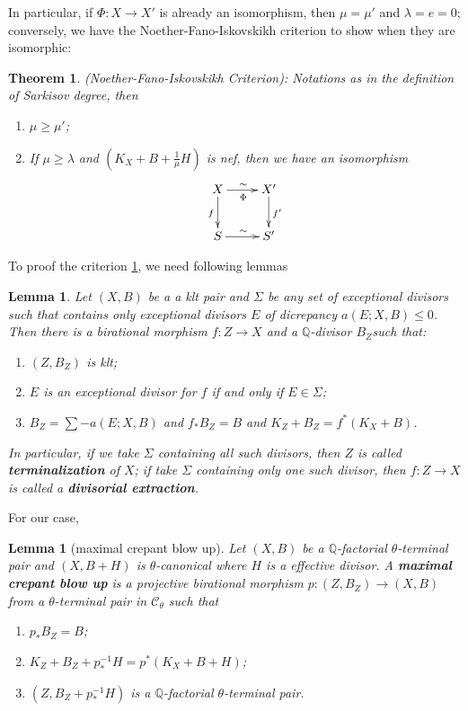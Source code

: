 \documentclass{article}
\newtheorem{lem}[defn]{Lemma}
\newtheorem{thm}[defn]{Theorem}
\begin{document}
In particular, if $\Phi:X\to X'$ is already an isomorphism, then $\mu=\mu'$ and $\lambda=e=0$; conversely, we have the Noether-Fano-Iskovskikh criterion to show when they are isomorphic:
\begin{thm}\label{nfi}
  (Noether-Fano-Iskovskikh Criterion): Notations as in the definition of Sarkisov degree, then 
  \begin{enumerate}
    \item $ \mu\geqslant \mu' $;
    \item If $ \mu \geqslant \lambda $ and $ (K_X+B+\frac{1}{\mu} H) $ is nef, then we have an isomorphism
      \[ \xymatrix{
          X\ar[r]^\sim_\Phi\ar[d]_f&X'\ar[d]^{f'}\\
      S\ar[r]^\sim& S' } \]
  \end{enumerate}
\end{thm}
To proof the criterion \ref{nfi}, we need following lemmas
\begin{lem}\label{extraction}
Let $ (X,B) $ be a a klt pair and $\Sigma$ be any set of exceptional divisors such that  contains only exceptional divisors $ E $ of dicrepancy $ a(E;X,B)\leqslant 0 $. Then there is a birational morphism $ f:Z\to X $ and a $ \mathbb{Q} $-divisor $ B_Z $such that:
  \begin{enumerate}
    \item $ (Z,B_Z) $ is klt;
    \item $ E $ is an exceptional divisor for $ f $ if and only if $ E\in\Sigma $;
    \item $ B_Z=\sum-a(E;X,B) $ and $ f_*B_Z=B $ and $ K_Z+B_Z=f^*(K_X+B) $.
  \end{enumerate} 
  In particular, if we take $ \Sigma $ containing all such divisors, then $ Z $ is called \textbf{terminalization} of $ X $; if take $ \Sigma $ containing only one such divisor, then $ f:Z\to X $ is called a \textbf{divisorial extraction}.    
\end{lem}

For our case,
\begin{lem}[maximal crepant blow up]
Let $ (X,B) $ be a $ \mathbb{Q} $-factorial $ \theta $-terminal pair and $ (X,B+H) $ is $ \theta $-canonical where $ H$ is a effective divisor. A \textbf{maximal crepant blow up} is a projective birational morphism $ p:(Z,B_Z)\to (X,B) $ from a $ \theta $-terminal pair in $ \mathcal{C}_\theta $ such that
  \begin{enumerate}
    \item $ p_*B_Z=B $;
    \item $ K_Z+B_Z+p^{-1}_*H=p^*(K_X+B+H) $;
    \item $ (Z,B_Z+p^{-1}_*H) $ is a $ \mathbb{Q} $-factorial $\theta $-terminal pair.
  \end{enumerate}  
\end{lem}
\end{document}
